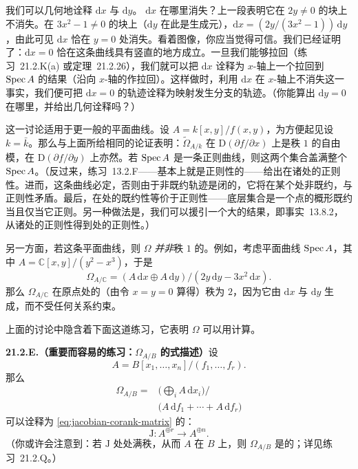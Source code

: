我们可以几何地诠释 $\mathrm{d}x$ 与 $\mathrm{d}y$。\trDifferential{} $\mathrm{d}x$ 在哪里消失？上一段表明它在 $2y\ne 0$ 的块上不消失。在 $3x^2-1\ne 0$ 的块上（$\mathrm{d}y$ 在此是生成元），$\mathrm{d}x=(2y/(3x^2-1))\,\mathrm{d}y$，由此可见 $\mathrm{d}x$ 恰在 $y=0$ 处消失。看着图像，你应当觉得可信。我们已经证明了：$\mathrm{d}x=0$ 恰在这条曲线具有竖直\trTangentVector{}的地方成立。一旦我们能够拉回\trDifferential（\mbox{练习~21.2.K(a)} 或\mbox{定理~21.2.26}），我们就可以把 $\mathrm{d}x$ 诠释为 $x$-轴上一个\trDifferential{}拉回到 $\operatorname{Spec} A$ 的结果（沿向 $x$-轴的\trProjection{}作拉回）。这样做时，利用 $\mathrm{d}x$ 在 $x$-轴上不消失这一事实，我们便可把 $\mathrm{d}x=0$ 的轨迹诠释为\trProjection{}映射发生分支的轨迹。（你能算出 $\mathrm{d}y=0$ 在哪里，并给出几何诠释吗？）

这一讨论适用于更一般的平面曲线。设 $A=k[x,y]/f(x,y)$，为方便起见设 $k=\bar{k}$。那么与上面所给相同的论证表明：$\widetilde{\Omega}_{A/k}$ 在\trOpenSubset{} $\mathrm{D}(\partial f/\partial x)$ 上是秩 $1$ 的自由模，在 $\mathrm{D}(\partial f/\partial y)$ 上亦然。若 $\operatorname{Spec} A$ 是一条正则曲线，则这两个集合盖满整个 $\operatorname{Spec} A$。（反过来，\mbox{练习~13.2.F}——基本上就是正则性的\trJacobianCriterion——给出在诸\trClosedPoint{}处的正则性。进而，这条曲线必定\trReduced，否则由于非既约轨迹是闭的，它将在某个\trClosedPoint{}处非既约，与正则性矛盾。最后，在\trGenericPoint{}处的既约性等价于正则性——底层集合是一个点的概形既约当且仅当它正则。另一种做法是，我们可以援引一个大的结果，即\mbox{事实~13.8.2}，从诸\trClosedPoint{}处的正则性得到\trGenericPoint{}处的正则性。）

另一方面，若这条平面曲线\trSingular，则 $\Omega$ \emph{并非}秩 $1$ 的\trLocallyFreeSheaf。例如，考虑平面曲线 $\operatorname{Spec} A$，其中 $A=\mathbb{C}[x,y]/(y^2-x^3)$，于是
\[
\Omega_{A/\mathbb{C}}=(A\,\mathrm{d}x\oplus A\,\mathrm{d}y)/(2y\,\mathrm{d}y-3x^2\,\mathrm{d}x).
\]
那么 $\Omega_{A/\mathbb{C}}$ 在原点处的\trFiber（由令 $x=y=0$ 算得）秩为 $2$，因为它由 $\mathrm{d}x$ 与 $\mathrm{d}y$ 生成，而不受任何关系约束。

上面的讨论中隐含着下面这道练习，它表明 $\Omega$ 可以用\trJacobianMatrix{}计算。

\textbf{21.2.E.（重要而容易的练习：$\Omega_{A/B}$ 的\trJacobianMatrix{}式描述）}\quad 设
\[
A=B[x_1,\dots,x_n]\big/(f_1,\dots,f_r).
\]
那么
\[
\begin{aligned}
\Omega_{A/B}={}&\biggl(\bigoplus_i A\,\mathrm{d}x_i\biggr)\big/\\
&\bigl(A\,\mathrm{d}f_1+\cdots+A\,\mathrm{d}f_r\bigr)
\end{aligned}
\]
可以诠释为\trJacobianMatrix{} \eqref{eq:jacobian-corank-matrix} 的\trCokernel：
\[
\mathrm{J}\colon A^{\oplus r}\longrightarrow A^{\oplus n}.
\]
（你或许会注意到：若 $\mathrm{J}$ 处处满秩，从而 $A$ 在 $B$ 上\trSmooth，则 $\Omega_{A/B}$ 是\trLocallyFree{}的；详见\mbox{练习~21.2.Q}。）

